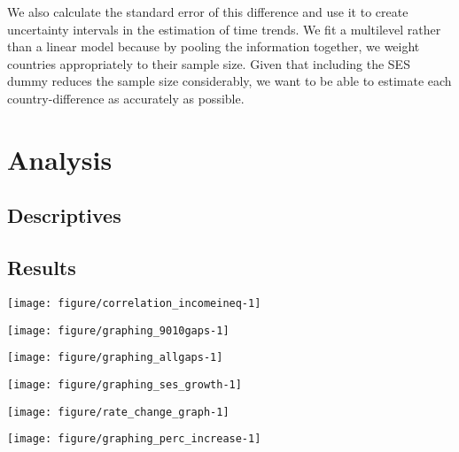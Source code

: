 \documentclass[11pt, a4paper]{article}\usepackage[]{graphicx}\usepackage[]{color}
\begin{document}
We also calculate the standard error of this difference and use it to create uncertainty intervals in the estimation of time trends. We fit a multilevel rather than a linear model because by pooling the information together, we weight countries appropriately to their sample size. Given that including the SES dummy reduces the sample size considerably, we want to be able to estimate each country-difference as accurately as possible.


\section{Analysis}

\subsection{Descriptives}





\subsection{Results}



{\centering \texttt{[image: figure/correlation\_incomeineq-1]} 

}






{\centering \texttt{[image: figure/graphing\_9010gaps-1]} 

}






{\centering \texttt{[image: figure/graphing\_allgaps-1]} 

}






{\centering \texttt{[image: figure/graphing\_ses\_growth-1]} 

}










{\centering \texttt{[image: figure/rate\_change\_graph-1]} 

}








{\centering \texttt{[image: figure/graphing\_perc\_increase-1]} 

}









\end{document}
